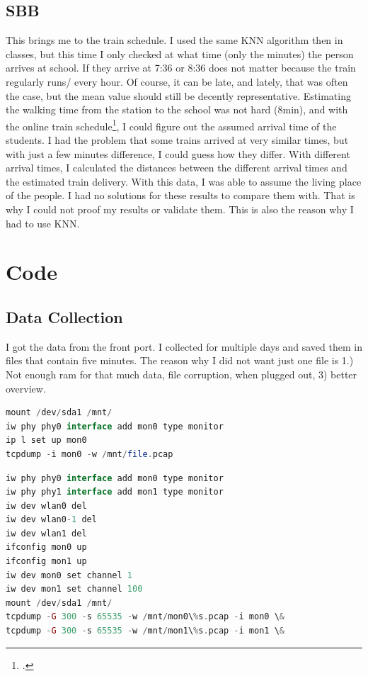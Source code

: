 \documentclass[11pt]{article}
\begin{document}
\subsection{SBB}
This brings me to the train schedule. I used the same KNN algorithm then in classes, but this time I only checked at what time (only the minutes) the person arrives at school. If they arrive at 7:36 or 8:36 does not matter because the train regularly runs/ every hour. Of course, it can be late, and lately, that was often the case, but the mean value should still be decently representative. Estimating the walking time from the station to the school was not hard (8min), and with the online train schedule\footcite{sbbonlinefahrplan}, I could figure out the assumed arrival time of the students. I had the problem that some trains arrived at very similar times, but with just a few minutes difference, I could guess how they differ. With different arrival times, I calculated the distances between the different arrival times and the estimated train delivery. With this data, I was able to assume the living place of the people. I had no solutions for these results to compare them with. That is why I could not proof my results or validate them. This is also the reason why I had to use KNN.


\section{Code}
\subsection{Data Collection}
I got the data from the front port. I collected for multiple days and saved them in files that contain five minutes. The reason why I did not want just one file is 1.) Not enough ram for that much data, file corruption, when plugged out, 3) better overview.



\begin{lstlisting}[language=PHP, caption="Idea to put Wi-Fi card into monitor mode",style=php]
mount /dev/sda1 /mnt/
iw phy phy0 interface add mon0 type monitor 
ip l set up mon0 
tcpdump -i mon0 -w /mnt/file.pcap
\end{lstlisting}


\begin{lstlisting}[language=PHP,caption="Actual code used for the WiFi pineapple",style=php]
iw phy phy0 interface add mon0 type monitor
iw phy phy1 interface add mon1 type monitor
iw dev wlan0 del
iw dev wlan0-1 del
iw dev wlan1 del
ifconfig mon0 up
ifconfig mon1 up
iw dev mon0 set channel 1
iw dev mon1 set channel 100
mount /dev/sda1 /mnt/
tcpdump -G 300 -s 65535 -w /mnt/mon0\%s.pcap -i mon0 \&
tcpdump -G 300 -s 65535 -w /mnt/mon1\%s.pcap -i mon1 \&
\end{lstlisting}
\end{document}
